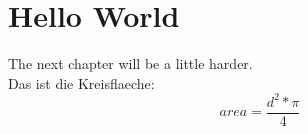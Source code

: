 \documentclass[11pt]{article}
\begin{document}
\section{Hello World}

The next chapter will be a little harder. 
\\

Das ist die Kreisflaeche:
\begin{equation}
	area = \frac{d^2 * \pi}{4}
\end{equation}
\end{document}
